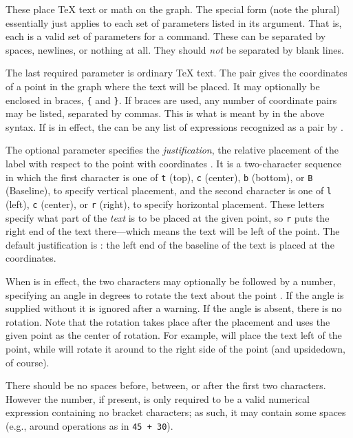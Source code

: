 \documentclass[letterpaper]{article}
\begin{document}
These place \TeX{} text or math on the graph. The special form
 (note the plural) essentially just applies  to
each set of parameters listed in its argument. That is, each
 is a valid set of parameters for a 
command. These can be separated by spaces, newlines, or nothing at all.
They should \emph{not} be separated by blank lines.

The last required parameter is ordinary \TeX{} text. The pair
 gives the coordinates of a point in the graph
where the text will be placed. It may optionally be enclosed in braces,
\verb${$ and \verb$}$. If braces are used, any number of coordinate
pairs may be listed, separated by commas. This is what is meant by
 in the above syntax. If  is in effect,
the  can be any list of expressions recognized as a pair
by \MP{}.

The optional parameter  specifies the
\emph{justification}, the relative placement of the label with respect
to the point with coordinates . It is a
two-character sequence in which the first character is one of \texttt{t}
(top), \texttt{c} (center), \texttt{b} (bottom), or \texttt{B}
(Baseline), to specify vertical placement, and the second character is
one of \texttt{l} (left), \texttt{c} (center), or \texttt{r} (right), to
specify horizontal placement. These letters specify what part of the
\emph{text} is to be placed at the given point, so \texttt{r} puts the
right end of the text there---which means the text will be left of the
point. The default justification is : the left end of the
baseline of the text is placed at the coordinates.

When  is in effect, the two characters may optionally be
followed by a number, specifying an angle in degrees to rotate the text
about the point . If the angle is supplied
without  it is ignored after a warning. If the angle is
absent, there is no rotation. Note that the rotation takes place after
the placement and uses the given point as the center of rotation. For
example,  will place the text left of the point, while
 will rotate it around to the right side of the point (and
upsidedown, of course).

There should be no spaces before, between, or after the first two
characters. However the number, if present, is only required to be a
valid \MP{} numerical expression containing no bracket characters; as
such, it may contain some spaces (e.g., around operations as in
\texttt{45 + 30}).
\end{document}
